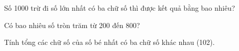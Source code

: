 \begin{ex}
Số 1000 trừ đi số lớn nhất có ba chữ số thì được kết quả bằng bao nhiêu?
\end{ex}

\begin{ex}
Có bao nhiêu số tròn trăm từ 200 đến 800?
\end{ex}

\begin{ex}
Tính tổng các chữ số của số bé nhất có ba chữ số khác nhau (102).
\end{ex}
